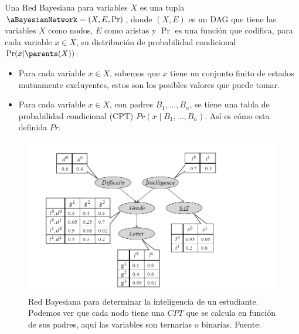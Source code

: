 
\begin{definition}
Una Red Bayesiana para variables \(X\) es una tupla \(\aBayesianNetwork = (X, E, \Pr)\), donde \((X, E)\) es un DAG que tiene las variables \(X\) como nodos, $E$ como aristas y \(\Pr\) es una función que codifica, para cada variable \(x \in X\), su distribución de probabilidad condicional \(\Pr(x | \parents(X))\):

\begin{itemize}
    \item Para cada variable $x \in X$, sabemos que $x$ tiene un conjunto finito de estados mutuamente excluyentes, estos son los posibles valores que puede tomar.
    \item Para cada variable $x \in X$, con padres $B_1, \dots, B_n$, se tiene una tabla de probabilidad condicional (CPT) $Pr(x \mid B_1, \dots, B_n)$. Así es cómo esta definida $Pr$.
\end{itemize}
    
\end{definition}

\begin{figure}[ht]
    \centering
    \includegraphics[scale=0.4]{img/bayesianNetworks/bayesianNetworks.png}
    \caption{Red Bayesiana para determinar la inteligencia de un estudiante. Podemos ver que cada nodo tiene una $CPT$ que se calcula en función de sus padres, aquí las variables son ternarias o binarias. Fuente: \cite{probabilisticGraphicalModels}}
    \label{fig:bayesian_network_example}
\end{figure}

